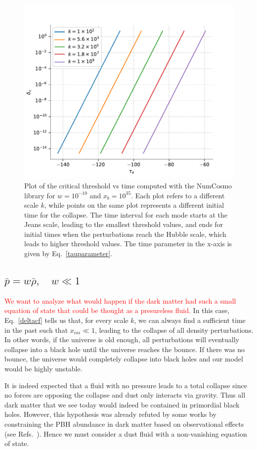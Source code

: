 \documentclass[a4paper,11pt]{article}
\begin{document}
\begin{figure}[tbp]
	\centering
	\includegraphics[width=.6\textwidth]{deltac_jh_vs_tau.pdf}
	\caption{ Plot of the critical threshold vs time computed with the NumCosmo library for $w = 10^{-10}$ and $x_b = 10^{35}$. Each plot refers to a different scale $k$, while points on the same plot represents a different initial time for the collapse. The time interval for each mode starts at the Jeans scale, leading to the smallest threshold values, and ends for initial times when the perturbations reach the Hubble scale, which leads to higher threshold values. The time parameter in the x-axis is given by Eq.~\eqref{tauparameter}.}
	\label{deltacfig}
\end{figure}
\newpage
\subsection{$\bar{p} = w \bar{\rho}, \quad w \ll 1$}
\textcolor{red}{We want to analyze what would happen if the dark matter had such a small equation of state that could be thought as a presureless fluid.} In this case, Eq.~\eqref{deltacf} tells us that, for every scale $k$, we can always find a sufficient time in the past such that $x_{ini} \ll 1$, leading to the collapse of all density perturbations. In other words, if the universe is old enough, all perturbations will eventually collapse into a black hole until the universe reaches the bounce. If there was no bounce, the universe would completely collapse into black holes and our model would be highly unstable.

It is indeed expected that a fluid with no pressure leads to a total collapse since no forces are opposing the collapse and dust only interacts via gravity. Thus all dark matter that we see today would indeed be contained in primordial black holes. However, this hypothesis was already refuted by some works by constraining the PBH abundance in dark matter based on observational effects (see Refs.~\cite{Villanueva2021, Carr2021}). Hence we must consider a dust fluid with a non-vanishing equation of state.
\end{document}
